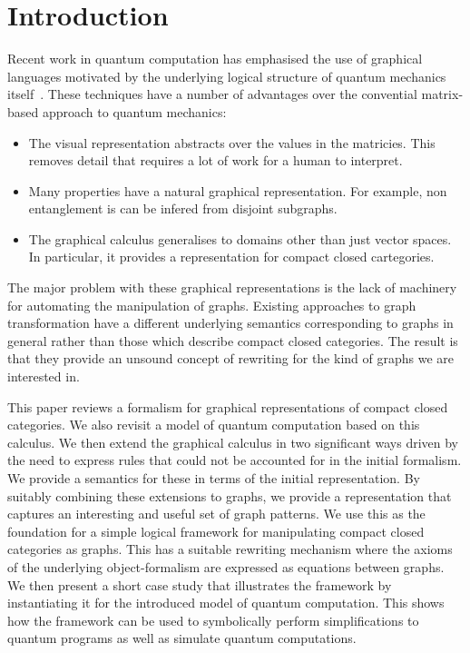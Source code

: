 \documentclass[runningheads]{llncs}
\begin{document}
\section{Introduction}
\label{sec:introduction}

Recent work in quantum computation has emphasised the use of graphical
languages motivated by the underlying logical structure of quantum
mechanics
itself~\cite{AbrCoe:CatSemQuant:2004,Selinger:dagger:2005,Coecke2005Kindergarten-Qu,Coecke2006POVMs-and-Naima,Coecke2006Quantum-Measure}.
These techniques have a number of advantages over the convential
matrix-based approach to quantum mechanics:

\begin{itemize}
\item The visual representation abstracts over the values in the
  matricies. This removes detail that requires a lot of work for a
  human to interpret. 

\item Many properties have a natural graphical representation. For
  example, non entanglement is can be infered from disjoint subgraphs.

\item The graphical calculus generalises to domains other than just
  vector spaces. In particular, it provides a representation for
  compact closed cartegories. 

\end{itemize}

The major problem with these graphical representations is the lack of
machinery for automating the manipulation of graphs.  Existing
approaches to graph transformation have a different underlying
semantics corresponding to graphs in general rather than those which
describe compact closed categories. The result is that they provide an
unsound concept of rewriting for the kind of graphs we are interested
in.

This paper reviews a formalism for graphical representations of
compact closed categories. We also revisit a model of quantum
computation based on this calculus. We then extend the graphical
calculus in two significant ways driven by the need to express rules
that could not be accounted for in the initial formalism. We provide a
semantics for these in terms of the initial representation. By
suitably combining these extensions to graphs, we provide a
representation that captures an interesting and useful set of graph
patterns. We use this as the foundation for a simple logical framework
for manipulating compact closed categories as graphs. This has a
suitable rewriting mechanism where the axioms of the underlying
object-formalism are expressed as equations between graphs. We then
present a short case study that illustrates the framework by
instantiating it for the introduced model of quantum computation.
This shows how the framework can be used to symbolically perform
simplifications to quantum programs as well as simulate quantum
computations.
\end{document}
